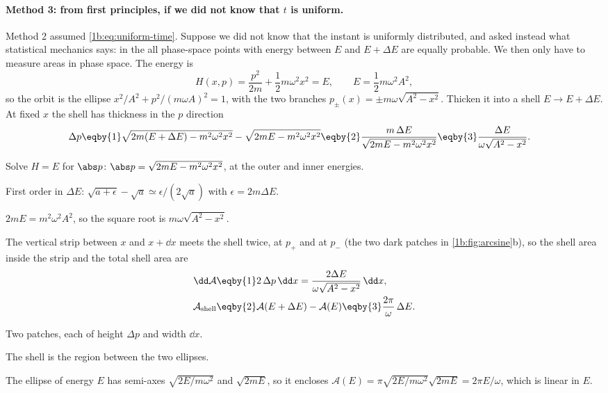 \paragraph{Method 3: from first principles, if we did not know that $t$ is uniform.}
Method 2 assumed \eqref{1b:eq:uniform-time}. Suppose we did not know that the
instant is uniformly distributed, and asked instead what statistical mechanics
says: in the  all phase-space points with
energy between $E$ and $E+\Delta E$ are equally probable. We then only have to
measure areas in phase space. The energy is
\begin{equation*}
  H(x,p)=\frac{p^2}{2m}+\frac12m\omega^2x^2=E,
  \qquad E=\frac12m\omega^2A^2,
\end{equation*}
so the orbit is the ellipse $x^2/A^2+p^2/(m\omega A)^2=1$, with the two branches
$p_\pm(x)=\pm m\omega\sqrt{A^2-x^2}$. Thicken it into a shell
$E\to E+\Delta E$. At fixed $x$ the shell has thickness in the $p$ direction
\begin{align*}
  \Delta p
  &\eqby{1} \sqrt{2m(E+\Delta E)-m^2\omega^2x^2}-\sqrt{2mE-m^2\omega^2x^2}
   \eqby{2} \frac{m\,\Delta E}{\sqrt{2mE-m^2\omega^2x^2}}
   \eqby{3} \frac{\Delta E}{\omega\sqrt{A^2-x^2}} .
\end{align*}
\begin{explain}
  \item Solve $H=E$ for $\abs p$: $\abs p=\sqrt{2mE-m^2\omega^2x^2}$, at the outer
        and inner energies.
  \item First order in $\Delta E$: $\sqrt{a+\epsilon}-\sqrt a\simeq\epsilon/(2\sqrt a)$
        with $\epsilon=2m\Delta E$.
  \item $2mE=m^2\omega^2A^2$, so the square root is $m\omega\sqrt{A^2-x^2}$.
\end{explain}
The vertical strip between $x$ and $x+\dd x$ meets the shell twice, at $p_+$ and
at $p_-$ (the two dark patches in \cref{1b:fig:arcsine}b), so the shell area
inside the strip and the total shell area are
\begin{align*}
  \dd\mathcal A
  &\eqby{1} 2\,\Delta p\,\dd x
   = \frac{2\Delta E}{\omega\sqrt{A^2-x^2}}\,\dd x,
  \\
  \mathcal A_{\rm shell}
  &\eqby{2} \mathcal A(E+\Delta E)-\mathcal A(E)
   \eqby{3} \frac{2\pi}{\omega}\,\Delta E .
\end{align*}
\begin{explain}
  \item Two patches, each of height $\Delta p$ and width $\dd x$.
  \item The shell is the region between the two ellipses.
  \item The ellipse of energy $E$ has semi-axes $\sqrt{2E/m\omega^2}$ and $\sqrt{2mE}$,
        so it encloses $\mathcal A(E)=\pi\sqrt{2E/m\omega^2}\sqrt{2mE}=2\pi E/\omega$,
        which is linear in $E$.
\end{explain}
